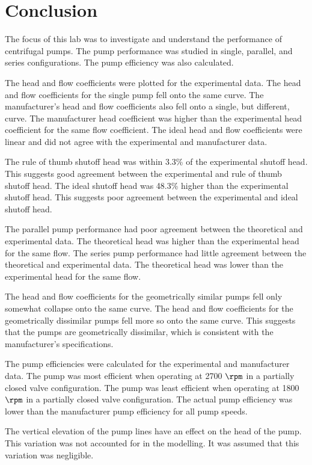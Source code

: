 \section{Conclusion}
The focus of this lab was to investigate and understand the performance of centrifugal pumps. The pump performance was studied in single, parallel, and series configurations. The pump efficiency was also calculated. 

The head and flow coefficients were plotted for the experimental data. The head and flow coefficients for the single pump fell onto the same curve. The manufacturer's head and flow coefficients also fell onto a single, but different, curve. The manufacturer head coefficient was higher than the experimental head coefficient for the same flow coefficient. The ideal head and flow coefficients were linear and did not agree with the experimental and manufacturer data.

The rule of thumb shutoff head was within 3.3\% of the experimental shutoff head. This suggests good agreement between the experimental and rule of thumb shutoff head. The ideal shutoff head was 48.3\% higher than the experimental shutoff head. This suggests poor agreement between the experimental and ideal shutoff head.

The parallel pump performance had poor agreement between the theoretical and experimental data. The theoretical head was higher than the experimental head for the same flow. The series pump performance had little agreement between the theoretical and experimental data. The theoretical head was lower than the experimental head for the same flow.

The head and flow coefficients for the geometrically similar pumps fell only somewhat collapse onto the same curve. The head and flow coefficients for the geometrically dissimilar pumps fell more so onto the same curve. This suggests that the pumps are geometrically dissimilar, which is consistent with the manufacturer's specifications.

The pump efficiencies were calculated for the experimental and manufacturer data. The pump was most efficient when operating at 2700 $\unit{\rpm}$ in a partially closed valve configuration. The pump was least efficient when operating at 1800 $\unit{\rpm}$ in a partially closed valve configuration. The actual pump efficiency was lower than the manufacturer pump efficiency for all pump speeds.

The vertical elevation of the pump lines have an effect on the head of the pump. This variation was not accounted for in the modelling. It was assumed that this variation was negligible.

